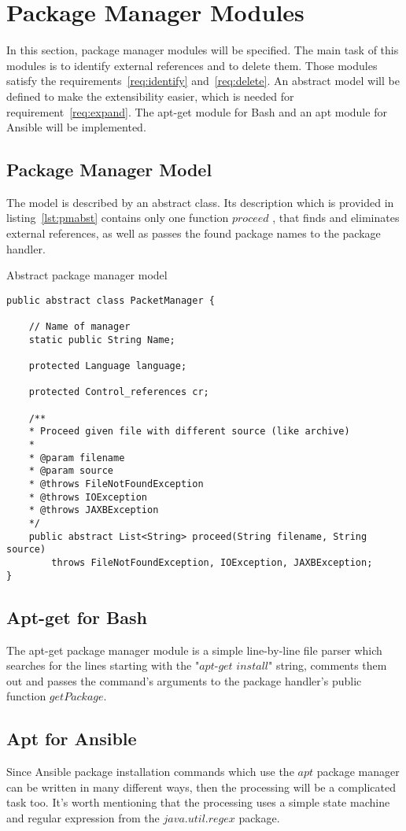 \section{Package Manager Modules}
In this section, package manager modules will be specified.
The main task of this modules is to identify external references and to delete them.
Those modules satisfy the requirements~\ref{req:identify} and~\ref{req:delete}.
An abstract model will be defined to make the extensibility easier, which is needed for requirement~\ref{req:expand}.
The apt-get module for Bash and an apt module for Ansible will be implemented.
\subsection*{Package Manager Model}
The model is described by an abstract class.
Its description which is provided in listing~\ref{lst:pmabst} contains only one function $proceed$ , that finds and eliminates external references, as well as passes the found package names to the package handler.
\begin{Listing}
	\caption{Abstract package manager model}
	\label{lst:pmabst}
\begin{lstlisting}
public abstract class PacketManager {
	
	// Name of manager
	static public String Name;
	
	protected Language language;
	
	protected Control_references cr;
	
	/**
	* Proceed given file with different source (like archive)
	* 
	* @param filename
	* @param source
	* @throws FileNotFoundException
	* @throws IOException
	* @throws JAXBException
	*/
	public abstract List<String> proceed(String filename, String source) 
		throws FileNotFoundException, IOException, JAXBException;
}
\end{lstlisting}
\end{Listing}
\subsection*{Apt-get for Bash}
The apt-get package manager module is a simple line-by-line file parser which searches for the lines starting with the "$apt$-$get$ $install$" string, comments them out and passes the command's arguments to the package handler's public function $getPackage$. 
\subsection*{Apt for Ansible}
Since Ansible package installation commands which use the $apt$ package manager can be written in many different ways, then the processing will be a complicated task too.
It's worth mentioning that the processing uses a simple state machine and regular expression from the $java$.$util$.$regex$ package.

